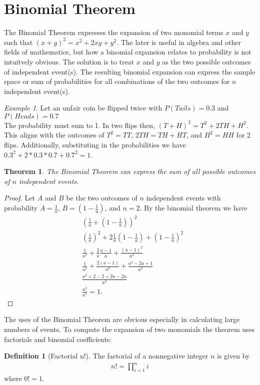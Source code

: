 \documentclass{article}
\theoremstyle{plain}
\newtheorem{theorem}{Theorem}
\theoremstyle{definition}
\newtheorem{definition}{Definition}
\theoremstyle{remark}
\newtheorem{example}{Example}
\begin{document}
\section{Binomial Theorem}
The Binomial Theorem expresses the expansion of two monomial terms $x$ and $y$ such that $(x + y)^2 = x^2 + 2xy + y^2$. The later is useful in algebra and other fields of mathematics, but how a binomial expansion relates to probability is not intuitvely obvious. The solution is to treat $x$ and $y$ as the two possible outcomes of independent event(s). The resulting binomial expansion can express the sample space or sum of probabilities for all combinations of the two outcomes for $n$ independent event(s).
\begin{example}
  Let an unfair coin be flipped twice with $P(Tails) = 0.3$ and $P(Heads) = 0.7$ \\
  The probability must sum to 1. In two flips then, $(T + H)^2 = T^2 + 2TH + H^2$. This aligns with the outcomes of $T^2 = TT$, $2TH = TH + HT$, and $H^2 = HH$ for 2 flips. Additionally, substituting in the probabilities we have $0.3^2 + 2*0.3*0.7 + 0.7^2 = 1$.
\end{example}
\begin{theorem}
  The Binomial Theorem can express the sum of all possible outcomes of $n$ independent events.
\end{theorem}
\begin{proof}
  Let $A$ and $B$ be the two outcomes of $n$ independent events with probability $A = \frac{1}{a}$, $B = (1 - \frac{1}{a})$, and $n = 2$. By the binomial theorem we have
  \begin{align*}
    &(\frac{1}{a} + (1-\frac{1}{a}))^2 \\
    &(\frac{1}{a})^2 + 2\frac{1}{a}(1-\frac{1}{a}) + (1-\frac{1}{a})^2 \\
    &\frac{1}{a^2} + \frac{2}{a}\frac{a-1}{a} + \frac{(a-1)^2}{a^2} \\
    &\frac{1}{a^2} + \frac{2(a-1)}{a^2} + \frac{a^2-2a+1}{a^2} \\
    &\frac{a^2+2-2+2a-2a}{a^2} \\
    &\frac{a^2}{a^2} = 1.
  \end{align*}
\end{proof}
The uses of the Binomial Theorem are obvious especially in calculating large numbers of events. To compute the expansion of two monomials the theorem uses factorials and binomial coefficients:
\begin{definition}[Factorial n!]
  The factorial of a nonnegative integer $n$ is given by
  \begin{align*}
    n! = {\displaystyle\prod_{i=1}^{n}i}
  \end{align*}
  where $0! = 1$.
\end{definition}
\end{document}
